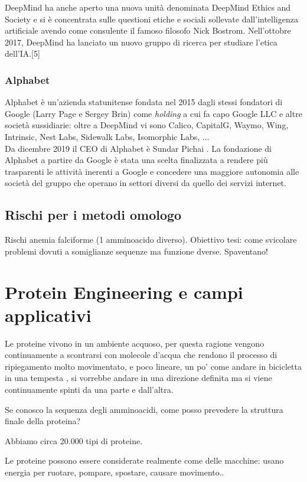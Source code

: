 DeepMind ha anche aperto una nuova unità denominata DeepMind Ethics and Society e si è concentrata sulle questioni etiche e sociali sollevate dall'intelligenza artificiale avendo come consulente il famoso filosofo Nick Bostrom. Nell'ottobre 2017, DeepMind ha lanciato un nuovo gruppo di ricerca per studiare l'etica dell'IA.[5]

\subsection{Alphabet}
Alphabet è un'azienda statunitense fondata nel 2015 dagli stessi fondatori di Google (Larry Page e Sergey Brin) come \textit{holding} a cui fa capo Google LLC e altre società sussidiarie: oltre a DeepMind vi sono Calico, CapitalG, Waymo, Wing, Intrinsic, Nest Labs, Sidewalk Labs, Isomorphic Labs, ...\\ 
Da dicembre 2019 il CEO di Alphabet è Sundar Pichai \cite{cnbc}.
La fondazione di Alphabet a partire da Google è stata una scelta finalizzata a rendere più trasparenti le attività inerenti a Google e concedere una maggiore autonomia alle società del gruppo che operano in settori diversi da quello dei servizi internet.


\section{Rischi per i metodi omologo}
Rischi anemia falciforme (1 amminoacido diverso).
Obiettivo tesi: come svicolare problemi dovuti a somiglianze sequenze ma funzione dverse. Spaventano! 


\chapter{Protein Engineering e campi applicativi}
Le proteine vivono in un ambiente acquoso, per questa ragione vengono continuamente a scontrarsi con molecole d'acqua che rendono il processo di ripiegamento molto movimentato, e poco lineare, un po' come andare in bicicletta in una tempesta \cite{}, si vorrebbe andare in una direzione definita ma si viene continuamente spinti da una parte e dall'altra.

Se conosco la sequenza degli amminoacidi, come posso prevedere la struttura finale della proteina?

Abbiamo circa 20.000 tipi di proteine.

Le proteine possono essere considerate realmente come delle macchine: usano energia per ruotare, pompare, spostare, causare movimento..

